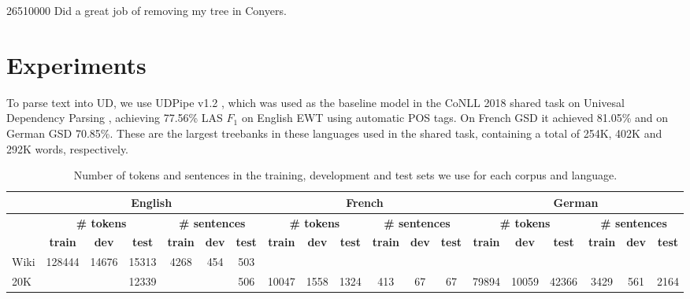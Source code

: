 \documentclass[11pt,a4paper]{article}
\begin{document}
26510000
Did a great job of removing my tree in Conyers.


\section{Experiments}\label{sec:experiments}

To parse text into UD, we use UDPipe v1.2 \cite{udpipe,udpipe:2017},
which was used as the baseline model in the CoNLL 2018 shared task on
Univesal Dependency Parsing \cite{zeman-EtAl:2018:K18-2},
achieving 77.56\% LAS $F_1$ on English EWT using automatic POS tags.
On French GSD it achieved 81.05\% and on German GSD 70.85\%.
These are the largest treebanks in these languages
used in the shared task, containing a total of 254K, 402K and 292K
words, respectively.

\begin{table*}[t]
\centering
\small
\setlength\tabcolsep{2pt}
\begin{tabular}{l|ccc|ccc||ccc|ccc||ccc|ccc}
& \multicolumn{6}{c||}{\footnotesize \bf English}
& \multicolumn{6}{c||}{\footnotesize \bf French}
& \multicolumn{6}{c}{\footnotesize \bf German} \\
\hline
& \multicolumn{3}{c|}{\footnotesize \bf {\#} tokens}
& \multicolumn{3}{c||}{\footnotesize \bf {\#} sentences}
& \multicolumn{3}{c|}{\footnotesize \bf {\#} tokens}
& \multicolumn{3}{c||}{\footnotesize \bf {\#} sentences}
& \multicolumn{3}{c|}{\footnotesize \bf {\#} tokens}
& \multicolumn{3}{c}{\footnotesize \bf {\#} sentences} \\
& \footnotesize \bf train & \footnotesize \bf dev & \footnotesize \bf test
& \footnotesize \bf train & \footnotesize \bf dev & \footnotesize \bf test
& \footnotesize \bf train & \footnotesize \bf dev & \footnotesize \bf test 
& \footnotesize \bf train & \footnotesize \bf dev & \footnotesize \bf test
& \footnotesize \bf train & \footnotesize \bf dev & \footnotesize \bf test
& \footnotesize \bf train & \footnotesize \bf dev & \footnotesize \bf test \\
\hline
Wiki & 128444 & 14676 & 15313 & 4268 & 454 & 503 &&&&&&&&&&&& \\
20K &&& 12339 &&& 506 & 10047 & 1558 & 1324 & 413 & 67 & 67 & 79894 & 10059 & 42366 & 3429 & 561 & 2164
\end{tabular}
\caption{Number of tokens and sentences in the training, development and test sets
we use for each corpus and language.\label{tab:corpora}}
\end{table*}
\end{document}
